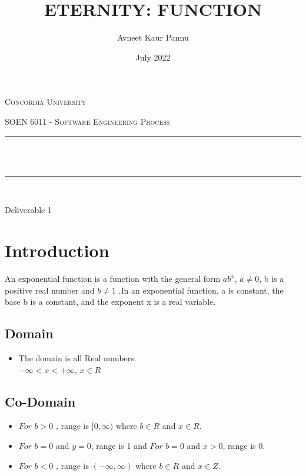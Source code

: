 \documentclass[12pt]{report}
\title{ETERNITY: FUNCTION}
\author{Avneet Kaur Pannu}
\date{July 2022}
\makeatletter
\let\thetitle\@title
\makeatother
\begin{document}
\begin{titlepage}
	\centering
    \vspace*{0.5 cm}
\begin{center}    \textsc{\Large Concordia University}\\[2.0 cm]	\end{center}
	\textsc{\Large  SOEN 6011 - Software Engineering Process }\\[0.5 cm]
	\rule{\linewidth}{0.2 mm} \\[0.4 cm]
	{ \huge \textbf \thetitle}\\[0.2 cm]
	{ \huge \textbf{}}
	\rule{\linewidth}{0.2 mm} \\[1.5 cm]

\begin{center}   {\Large Deliverable 1}\\[2.0 cm]
	
\end{center}
	
\end{titlepage}

\renewcommand{\thesection}{\arabic{section}}
\tableofcontents
\pagebreak

\section{Introduction}
An exponential function is a function with the general form $ab^{x}$, $a\neq 0$, b is a positive real number and $b\neq 1$ .In an exponential function, a is constant, the base b is a constant, and the exponent x is a real variable.

\subsection{Domain}
\begin{itemize}
\item The domain is all Real numbers.
\\$- \infty < x < + \infty$, $x \in R$
\end{itemize}

\subsection{Co-Domain}
\begin{itemize}
  \item  $For$ $ b > 0$ , range is $[0,\infty)$  where $ b \in R$  and  $x \in R$. 
  \item  $For$ $ b = 0$ and $y =0$, range is 1 and  $For$ $ b = 0$ and $x>0$, range is 0.
 \item  $For$ $ b < 0$ , range is $(-\infty,\infty)$  where $ b \in R$  and  $x \in Z$.
\end{itemize}
\end{document}
